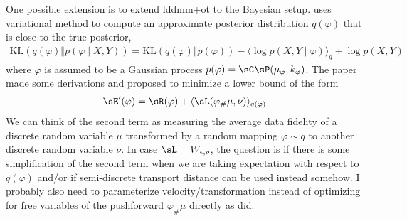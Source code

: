 \documentclass[11pt]{article}
\begin{document}
One possible extension is to extend lddmm+ot to the Bayesian setup. \cite{wassermannProbabilisticDiffeomorphicRegistration2014} uses variational method to compute an approximate posterior distribution $q(\varphi)$ that is close to the true posterior,
\begin{align}
    \text{KL}(q(\varphi) \Vert p(\varphi \mid X,Y) )
        = \text{KL}(q(\varphi) \Vert p(\varphi)) - \langle \log p(X,Y\mid \varphi) \rangle_{q} + \log p(X,Y)
\end{align}
where $\varphi$ is assumed to be a Gaussian process $p(\varphi) = \sG\sP( \mu_{\varphi}, k_{\varphi} )$. The paper made some derivations and proposed to minimize a lower bound of the form
\begin{align}
    \sE'(\varphi) 
        = \sR(\varphi) + \langle \sL(\varphi_{\#}\mu, \nu) \rangle_{q(\varphi)}
\end{align}
We can think of the second term as measuring the average data fidelity of a discrete random variable $\mu$ transformed by a random mapping $\varphi \sim q$ to another discrete random variable $\nu$. In case $\sL=W_{\epsilon,\rho}$, the question is if there is some simplification of the second term when we are taking expectation with respect to $q(\varphi)$ and/or if semi-discrete transport distance can be used instead somehow. I probably also need to parameterize velocity/transformation instead of optimizing for free variables of the pushforward $\varphi_{\#}\mu$ directly as \cite{feydyOptimalTransportDiffeomorphic2017a} did.



\newpage
\printbibliography 
\end{document}
